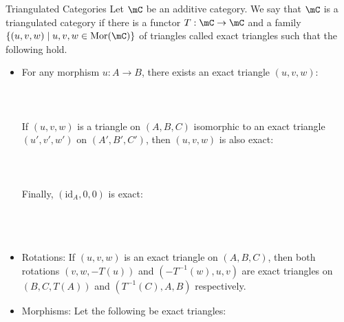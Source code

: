 \documentclass[a4paper]{article}
\begin{document}
\begin{defn}{Triangulated Categories}{} Let $\mC$ be an additive category. We say that $\mC$ is a triangulated category if there is a functor $T:\mC\to\mC$ and a family $\{(u,v,w)\;|\;u,v,w\in\text{Mor}(\mC)\}$ of triangles called exact triangles such that the following hold. 
\begin{itemize}
\item For any morphism $u:A\to B$, there exists an exact triangle $(u,v,w)$: \\~\\
\\~\\ 
If $(u,v,w)$ is a triangle on $(A,B,C)$ isomorphic to an exact triangle $(u',v',w')$ on $(A',B',C')$, then $(u,v,w)$ is also exact: \\~\\
\\~\\ 
Finally, $(\text{id}_A,0,0)$ is exact: \\~\\
\\~\\ 
\item Rotations: If $(u,v,w)$ is an exact triangle on $(A,B,C)$, then both rotations $(v,w,-T(u))$ and $(-T^{-1}(w),u,v)$ are exact triangles on $(B,C,T(A))$ and $(T^{-1}(C),A,B)$ respectively. 
\item Morphisms: Let the following be exact triangles: \\~\\

\end{itemize}
\end{defn}
\end{document}
